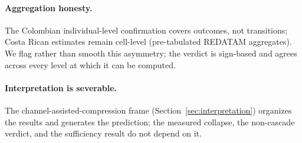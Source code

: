 \paragraph{Aggregation honesty.} The Colombian individual-level confirmation
covers outcomes, not transitions; Costa Rican estimates remain cell-level
(pre-tabulated REDATAM aggregates). We flag rather than smooth this asymmetry;
the verdict is sign-based and agrees across every level at which it can be
computed.

\paragraph{Interpretation is severable.} The channel-assisted-compression frame
(Section~\ref{sec:interpretation}) organizes the results and generates the
prediction; the measured collapse, the non-cascade verdict, and the sufficiency
result do not depend on it.
